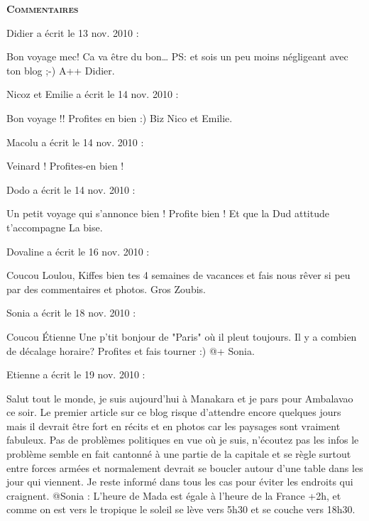 \bigskip
\textbf{\textsc{Commentaires}}

\medskip
Didier a écrit le 13 nov. 2010 :
\begin{displayquote}
Bon voyage mec! Ca va être du bon\dots
PS: et sois un peu moins négligeant avec ton blog ;-)
A++
Didier.
\end{displayquote}

\medskip
Nicoz et Emilie a écrit le 14 nov. 2010 :
\begin{displayquote}
Bon voyage !!
Profites en bien :)
Biz
Nico et Emilie.
\end{displayquote}

\medskip
Macolu a écrit le 14 nov. 2010 :
\begin{displayquote}
Veinard ! Profites-en bien !
\end{displayquote}

\medskip
Dodo a écrit le 14 nov. 2010 :
\begin{displayquote}
Un petit voyage qui s'annonce bien ! Profite bien !
Et que la Dud attitude t'accompagne
La bise.
\end{displayquote}

\medskip
Dovaline a écrit le 16 nov. 2010 :
\begin{displayquote}
Coucou Loulou,
Kiffes bien tes 4 semaines de vacances et fais nous rêver si peu par des commentaires et photos.
Gros Zoubis.
\end{displayquote}

\medskip
Sonia a écrit le 18 nov. 2010 :
\begin{displayquote}
Coucou Étienne
Une p'tit bonjour de "Paris" où il pleut toujours.
Il y a combien de décalage horaire?
Profites et fais tourner :)
@+
Sonia.
\end{displayquote}

\medskip
Etienne a écrit le 19 nov. 2010 :
\begin{displayquote}
Salut tout le monde, je suis aujourd'hui à Manakara et je pars pour Ambalavao ce soir. Le premier article sur ce blog risque d'attendre encore quelques jours mais il devrait être fort en récits et en photos car les paysages sont vraiment fabuleux. Pas de problèmes politiques en vue où je suis, n'écoutez pas les infos le problème semble en fait cantonné à une partie de la capitale et se règle surtout entre forces armées et normalement devrait se boucler autour d'une table dans les jour qui viennent. Je reste informé dans tous les cas pour éviter les endroits qui craignent.
@Sonia : L'heure de Mada est égale à l'heure de la France +2h, et comme on est vers le tropique le soleil se lève vers 5h30 et se couche vers 18h30.
\end{displayquote}

\vfill
